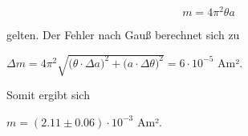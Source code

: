 \begin{equation}
  m = 4 \pi^2 \theta a
\end{equation}

gelten. Der Fehler nach Gauß berechnet sich zu

\vspace{.5em}
\centerline{$\Delta m = 4 \pi^2 \sqrt{ \bigg( \theta \cdot \Delta a \bigg)^2 + \bigg( a \cdot \Delta \theta \bigg)^2 } = 6 \cdot 10^{-5}$ Am².}
\vspace{.5em}

Somit ergibt sich

\vspace{.5em}
\centerline{$m = (2.11 \pm 0.06) \cdot 10^{-3}$ Am².}
\vspace{.5em}